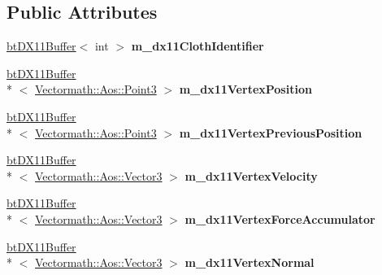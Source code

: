 \subsection*{Public Attributes}
\begin{DoxyCompactItemize}
\item 
\hypertarget{classbt_soft_body_vertex_data_d_x11_a1c1bac53311216bb3df46ee4db63db84}{\hyperlink{classbt_d_x11_buffer}{bt\+D\+X11\+Buffer}$<$ int $>$ {\bfseries m\+\_\+dx11\+Cloth\+Identifier}}\label{classbt_soft_body_vertex_data_d_x11_a1c1bac53311216bb3df46ee4db63db84}

\item 
\hypertarget{classbt_soft_body_vertex_data_d_x11_ad63d9e9f3a68e92f932174f5dd0f4db6}{\hyperlink{classbt_d_x11_buffer}{bt\+D\+X11\+Buffer}\\*
$<$ \hyperlink{class_vectormath_1_1_aos_1_1_point3}{Vectormath\+::\+Aos\+::\+Point3} $>$ {\bfseries m\+\_\+dx11\+Vertex\+Position}}\label{classbt_soft_body_vertex_data_d_x11_ad63d9e9f3a68e92f932174f5dd0f4db6}

\item 
\hypertarget{classbt_soft_body_vertex_data_d_x11_a27db279c4f02651a8256de0522a680f0}{\hyperlink{classbt_d_x11_buffer}{bt\+D\+X11\+Buffer}\\*
$<$ \hyperlink{class_vectormath_1_1_aos_1_1_point3}{Vectormath\+::\+Aos\+::\+Point3} $>$ {\bfseries m\+\_\+dx11\+Vertex\+Previous\+Position}}\label{classbt_soft_body_vertex_data_d_x11_a27db279c4f02651a8256de0522a680f0}

\item 
\hypertarget{classbt_soft_body_vertex_data_d_x11_a96d8c37749d952064b3353ca24045d5a}{\hyperlink{classbt_d_x11_buffer}{bt\+D\+X11\+Buffer}\\*
$<$ \hyperlink{class_vectormath_1_1_aos_1_1_vector3}{Vectormath\+::\+Aos\+::\+Vector3} $>$ {\bfseries m\+\_\+dx11\+Vertex\+Velocity}}\label{classbt_soft_body_vertex_data_d_x11_a96d8c37749d952064b3353ca24045d5a}

\item 
\hypertarget{classbt_soft_body_vertex_data_d_x11_a3d76696a7d31ef10280a79c4e14e3c67}{\hyperlink{classbt_d_x11_buffer}{bt\+D\+X11\+Buffer}\\*
$<$ \hyperlink{class_vectormath_1_1_aos_1_1_vector3}{Vectormath\+::\+Aos\+::\+Vector3} $>$ {\bfseries m\+\_\+dx11\+Vertex\+Force\+Accumulator}}\label{classbt_soft_body_vertex_data_d_x11_a3d76696a7d31ef10280a79c4e14e3c67}

\item 
\hypertarget{classbt_soft_body_vertex_data_d_x11_a522cebbfb6533538966542f5fdde1fea}{\hyperlink{classbt_d_x11_buffer}{bt\+D\+X11\+Buffer}\\*
$<$ \hyperlink{class_vectormath_1_1_aos_1_1_vector3}{Vectormath\+::\+Aos\+::\+Vector3} $>$ {\bfseries m\+\_\+dx11\+Vertex\+Normal}}\label{classbt_soft_body_vertex_data_d_x11_a522cebbfb6533538966542f5fdde1fea}


\end{DoxyCompactItemize}
